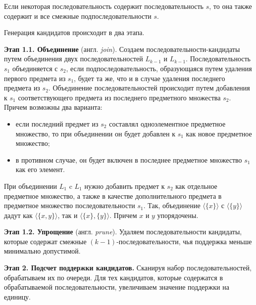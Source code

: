 Если некоторая последовательность содержит последовательность $s$, то она также содержит и все смежные подпоследовательности $s$.

Генерация кандидатов происходит в два этапа.

\textbf{Этап 1.1. Объединение} (англ. \textit{join}). Создаем последовательности-кандидаты путем объединения двух последовательностей $L_{k−1}$ и $L_{k−1}$. Последовательность $s_1$ объединяется с $s_2$, если подпоследовательность, образующаяся путем удаления первого предмета из $s_1$, будет та же, что и в случае удаления последнего предмета из $s_2$. Объединение последовательностей происходит путем добавления к $s_1$ соответствующего предмета из последнего предметного множества $s_2$. Причем возможны два варианта:
\begin{itemize}
	\item если последний предмет из $s_2$ составлял одноэлементное предметное множество, то при объединении он будет добавлен к $s_1$ как новое предметное множество;
	\item в противном случае, он будет включен в последнее предметное множество $s_1$ как его элемент.
\end{itemize}

При объединении $L_1$ c $L_1$ нужно добавить предмет к $s_2$ как отдельное предметное множество, а также в качестве дополнительного предмета в предметное множество последовательности $s_1$. Так, объединение $\langle\{x\}\rangle$ с $\langle\{y\}\rangle$ дадут как $\langle\{x, y\}\rangle$, так и $\langle\{x\},\{y\}\rangle$. Причем $x$ и $y$ упорядочены.

\textbf{Этап 1.2. Упрощение} (англ. \textit{prune}). Удаляем последовательности кандидаты, которые содержат смежные $(k-1)$-последовательности, чья поддержка меньше минимально допустимой.

\textbf{Этап 2. Подсчет поддержки кандидатов.} Сканируя набор последовательностей, обрабатываем их по очереди. Для тех кандидатов, которые содержатся в обрабатываемой последовательности, увеличиваем значение поддержки на единицу.	


